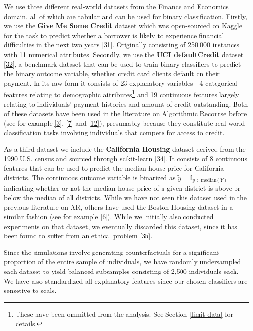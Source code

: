 \documentclass[conference,final,]{IEEEtran}
\theoremstyle{definition}
\theoremstyle{definition}
\theoremstyle{definition}
\theoremstyle{definition}
\theoremstyle{remark}
\begin{document}
We use three different real-world datasets from the Finance and Economics domain, all of which are tabular and can be used for binary classification. Firstly, we use the \textbf{Give Me Some Credit} dataset which was open-sourced on Kaggle for the task to predict whether a borrower is likely to experience financial difficulties in the next two years \protect\hyperlink{ref-gmsc_data}{{[}31{]}}. Originally consisting of 250,000 instances with 11 numerical attributes. Secondly, we use the \textbf{UCI defaultCredit} dataset \protect\hyperlink{ref-yeh2009comparisons}{{[}32{]}}, a benchmark dataset that can be used to train binary classifiers to predict the binary outcome variable, whether credit card clients default on their payment. In its raw form it consists of 23 explanatory variables - 4 categorical features relating to demographic attributes\footnote{These have been ommitted from the analysis. See Section \ref{limit-data} for details.} and 19 continuous features largely relating to individuals' payment histories and amount of credit outstanding. Both of these datasets have been used in the literature on Algorithmic Recourse before (see for example \protect\hyperlink{ref-pawelczyk2021carla}{{[}3{]}}, \protect\hyperlink{ref-joshi2019towards}{{[}7{]}} and \protect\hyperlink{ref-ustun2019actionable}{{[}12{]}}), presumably because they constitute real-world classification tasks involving individuals that compete for access to credit.

As a third dataset we include the \textbf{California Housing} dataset derived from the 1990 U.S. census and sourced through scikit-learn \protect\hyperlink{ref-pace1997sparse}{{[}34{]}}. It consists of 8 continuous features that can be used to predict the median house price for California districts. The continuous outcome variable is binarized as \(\tilde{y}=\mathbb{I}_{y>\text{median}(Y)}\) indicating whether or not the median house price of a given district is above or below the median of all districts. While we have not seen this dataset used in the previous literature on AR, others have used the Boston Housing dataset in a similar fashion (see for example \protect\hyperlink{ref-schut2021generating}{{[}6{]}}). While we initially also conducted experiments on that dataset, we eventually discarded this dataset, since it has been found to suffer from an ethical problem \protect\hyperlink{ref-carlisle2019racist}{{[}35{]}}.

Since the simulations involve generating counterfactuals for a significant proportion of the entire sample of individuals, we have randomly undersampled each dataset to yield balanced subsamples consisting of 2,500 individuals each. We have also standardized all explanatory features since our chosen classifiers are sensetive to scale.
\end{document}
